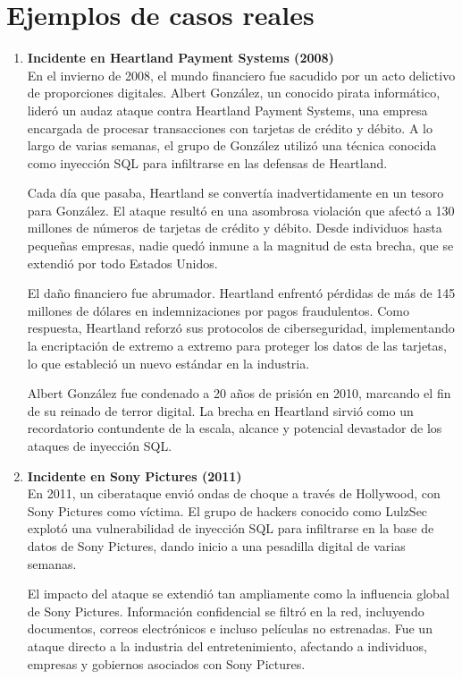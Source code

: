 \documentclass[11pt]{report}
\begin{document}
\section{Ejemplos de casos reales}
\begin{enumerate}
  \item \textbf{Incidente en Heartland Payment Systems (2008)} \\
  En el invierno de 2008, el mundo financiero fue sacudido por un acto delictivo de proporciones digitales. Albert González, un conocido
  pirata informático, lideró un audaz ataque contra Heartland Payment Systems, una empresa encargada de procesar transacciones con tarjetas
  de crédito y débito. A lo largo de varias semanas, el grupo de González utilizó una técnica conocida como inyección SQL para infiltrarse
  en las defensas de Heartland.

  Cada día que pasaba, Heartland se convertía inadvertidamente en un tesoro para González. El ataque resultó en una asombrosa violación que
  afectó a 130 millones de números de tarjetas de crédito y débito. Desde individuos hasta pequeñas empresas, nadie quedó inmune a la magnitud
  de esta brecha, que se extendió por todo Estados Unidos.

  El daño financiero fue abrumador. Heartland enfrentó pérdidas de más de 145 millones de dólares en indemnizaciones por pagos fraudulentos.
  Como respuesta, Heartland reforzó sus protocolos de ciberseguridad, implementando la encriptación de extremo a extremo para proteger los
  datos de las tarjetas, lo que estableció un nuevo estándar en la industria.

  Albert González fue condenado a 20 años de prisión en 2010, marcando el fin de su reinado de terror digital. La brecha en Heartland sirvió
  como un recordatorio contundente de la escala, alcance y potencial devastador de los ataques de inyección SQL.

  \item \textbf{Incidente en Sony Pictures (2011)} \\
  En 2011, un ciberataque envió ondas de choque a través de Hollywood, con Sony Pictures como víctima. El grupo de hackers conocido como LulzSec
  explotó una vulnerabilidad de inyección SQL para infiltrarse en la base de datos de Sony Pictures, dando inicio a una pesadilla digital de varias semanas.

  El impacto del ataque se extendió tan ampliamente como la influencia global de Sony Pictures. Información confidencial se filtró en la red, 
  incluyendo documentos, correos electrónicos e incluso películas no estrenadas. Fue un ataque directo a la industria del entretenimiento, afectando a 
  individuos, empresas y gobiernos asociados con Sony Pictures.


\end{enumerate}
\end{document}
